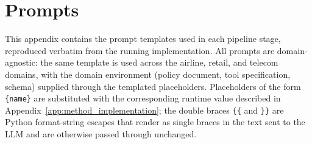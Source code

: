 \section{Prompts}
\label{app:prompts}

This appendix contains the prompt templates used in each pipeline stage, reproduced verbatim from the running implementation. All prompts are domain-agnostic: the same template is used across the airline, retail, and telecom domains, with the domain environment (policy document, tool specification, schema) supplied through the templated placeholders. Placeholders of the form \texttt{\{name\}} are substituted with the corresponding runtime value described in Appendix~\ref{app:method_implementation}; the double braces \texttt{\{\{} and \texttt{\}\}} are Python format-string escapes that render as single braces in the text sent to the LLM and are otherwise passed through unchanged.






